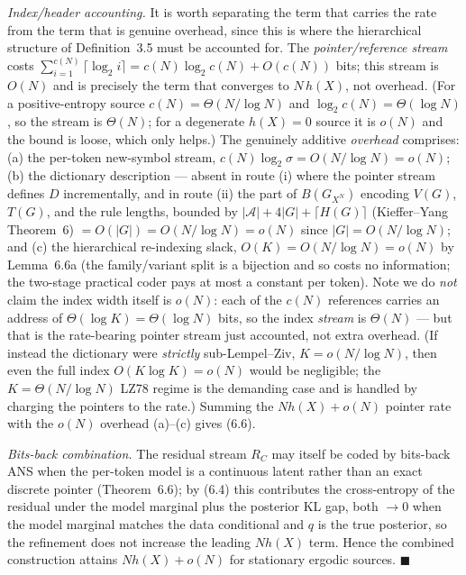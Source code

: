 \documentclass[
]{article}
\begin{document}
\emph{Index/header accounting.} It is worth separating the term that
carries the rate from the term that is genuine overhead, since this is
where the hierarchical structure of Definition~3.5 must be accounted
for. The \emph{pointer/reference stream} costs $\sum_{i=1}^{c(N)}
\lceil\log_2 i\rceil = c(N)\log_2 c(N) + O(c(N))$ bits; this stream is
$O(N)$ and is precisely the term that converges to $N\,h(X)$, not
overhead. (For a positive-entropy source $c(N) = \Theta(N/\log N)$ and
$\log_2 c(N) = \Theta(\log N)$, so the stream is $\Theta(N)$; for a
degenerate $h(X)=0$ source it is $o(N)$ and the bound is loose, which
only helps.) The genuinely additive
\emph{overhead} comprises: (a) the per-token new-symbol stream, $c(N)
\log_2\sigma = O(N/\log N) = o(N)$; (b) the dictionary description ---
absent in route (i) where the pointer stream defines $D$ incrementally,
and in route (ii) the part of $B(G_{X^N})$ encoding $V(G)$, $T(G)$, and
the rule lengths, bounded by $|\mathcal{A}| + 4|G| + \lceil H(G)\rceil$
(Kieffer--Yang Theorem~6) $= O(|G|) = O(N/\log N) = o(N)$ since $|G| =
O(N/\log N)$; and (c) the hierarchical re-indexing slack, $O(K) =
O(N/\log N) = o(N)$ by Lemma~6.6a (the family/variant split is a
bijection and so costs no information; the two-stage practical coder
pays at most a constant per token). Note we do \emph{not} claim the
index width itself is $o(N)$: each of the $c(N)$ references carries an
address of $\Theta(\log K) = \Theta(\log N)$ bits, so the index
\emph{stream} is $\Theta(N)$ --- but that is the rate-bearing pointer
stream just accounted, not extra overhead. (If instead the dictionary
were \emph{strictly} sub-Lempel--Ziv, $K = o(N/\log N)$, then even the
full index $O(K\log K) = o(N)$ would be negligible; the $K =
\Theta(N/\log N)$ LZ78 regime is the demanding case and is handled by
charging the pointers to the rate.) Summing the $N h(X) + o(N)$ pointer
rate with the $o(N)$ overhead (a)--(c) gives (6.6).

\emph{Bits-back combination.} The residual stream $R_C$ may itself be
coded by bits-back ANS when the per-token model is a continuous latent
rather than an exact discrete pointer (Theorem~6.6); by (6.4) this
contributes the cross-entropy of the residual under the model marginal
plus the posterior KL gap, both $\to 0$ when the model marginal matches
the data conditional and $q$ is the true posterior, so the refinement
does not increase the leading $N h(X)$ term. Hence the combined
construction attains $N h(X) + o(N)$ for stationary ergodic sources.
\hfill$\blacksquare$
\end{document}
